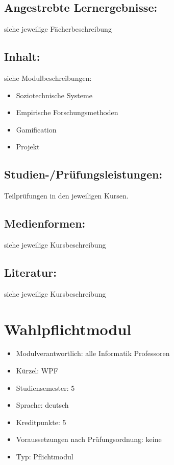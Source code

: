 \section*{Angestrebte
Lernergebnisse:}\label{angestrebte-lernergebnisse-27}

siehe jeweilige Fächerbeschreibung

\section*{Inhalt:}\label{inhalt-27}

siehe Modulbeschreibungen:

\begin{itemize}
\tightlist
\item
  Soziotechnische Systeme
\item
  Empirische Forschungsmethoden
\item
  Gamification
\item
  Projekt
\end{itemize}

\section*{Studien-/Prüfungsleistungen:}\label{studien-pruxfcfungsleistungen-25}

Teilprüfungen in den jeweiligen Kursen.

\section*{Medienformen:}\label{medienformen-18}

siehe jeweilige Kursbeschreibung

\section*{Literatur:}\label{literatur-23}

siehe jeweilige Kursbeschreibung

\chapter{Wahlpflichtmodul}\label{wahlpflichtmodul}

\begin{itemize}
\tightlist
\item
  Modulverantwortlich: alle Informatik Professoren
\item
  Kürzel: WPF
\item
  Studiensemester: 5
\item
  Sprache: deutsch
\item
  Kreditpunkte: 5
\item
  Voraussetzungen nach Prüfungsordnung: keine
\item
  Typ: Pflichtmodul
\end{itemize}

